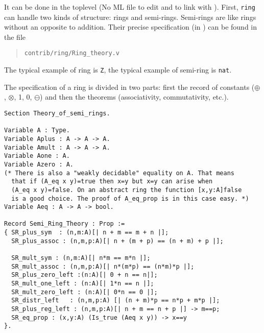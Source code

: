 It can be done in the \Coq toplevel (No ML file to edit and to link
with \Coq). First, \texttt{ring} can handle two kinds of structure:
rings and semi-rings. Semi-rings are like rings without an opposite to
addition. Their precise specification (in \gallina) can be found in
the file

\begin{quotation}
\begin{verbatim}
contrib/ring/Ring_theory.v
\end{verbatim}
\end{quotation}

The typical example of ring is \texttt{Z}, the typical
example of semi-ring is \texttt{nat}.

The specification of a
ring is divided in two parts: first the record of constants
($\oplus$, $\otimes$, 1, 0, $\ominus$) and then the theorems
(associativity, commutativity, etc.).

\begin{small}
\begin{flushleft}
\begin{verbatim}
Section Theory_of_semi_rings.

Variable A : Type.
Variable Aplus : A -> A -> A.
Variable Amult : A -> A -> A.
Variable Aone : A.
Variable Azero : A.
(* There is also a "weakly decidable" equality on A. That means 
  that if (A_eq x y)=true then x=y but x=y can arise when 
  (A_eq x y)=false. On an abstract ring the function [x,y:A]false
  is a good choice. The proof of A_eq_prop is in this case easy. *)
Variable Aeq : A -> A -> bool.

Record Semi_Ring_Theory : Prop :=
{ SR_plus_sym  : (n,m:A)[| n + m == m + n |];
  SR_plus_assoc : (n,m,p:A)[| n + (m + p) == (n + m) + p |];

  SR_mult_sym : (n,m:A)[| n*m == m*n |];
  SR_mult_assoc : (n,m,p:A)[| n*(m*p) == (n*m)*p |];
  SR_plus_zero_left :(n:A)[| 0 + n == n|];
  SR_mult_one_left : (n:A)[| 1*n == n |];
  SR_mult_zero_left : (n:A)[| 0*n == 0 |];
  SR_distr_left   : (n,m,p:A) [| (n + m)*p == n*p + m*p |];
  SR_plus_reg_left : (n,m,p:A)[| n + m == n + p |] -> m==p;
  SR_eq_prop : (x,y:A) (Is_true (Aeq x y)) -> x==y
}.
\end{verbatim}
\end{flushleft}
\end{small}

